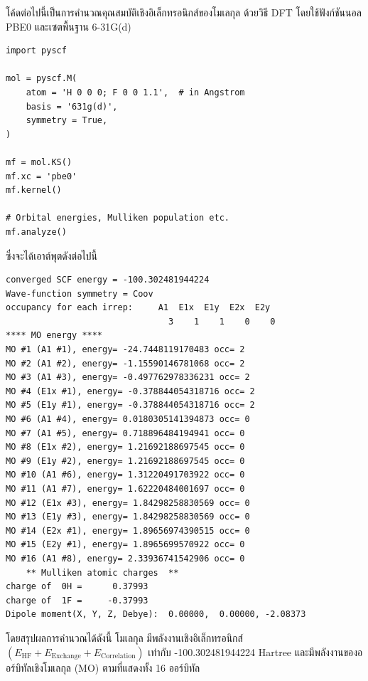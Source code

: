 โค้ดต่อไปนี้เป็นการคำนวณคุณสมบัติเชิงอิเล็กทรอนิกส์ของโมเลกุล  ด้วยวิธี DFT โดยใช้ฟังก์ชันนอล PBE0 และเซตพื้นฐาน 6-31G(d) 

\begin{lstlisting}[style=MyPython]
import pyscf

mol = pyscf.M(
    atom = 'H 0 0 0; F 0 0 1.1',  # in Angstrom
    basis = '631g(d)',
    symmetry = True,
)

mf = mol.KS()
mf.xc = 'pbe0'
mf.kernel()

# Orbital energies, Mulliken population etc.
mf.analyze()
\end{lstlisting}

\vspace{1em}
\noindent ซึ่งจะได้เอาต์พุตดังต่อไปนี้

\begin{lstlisting}[style=plain]
converged SCF energy = -100.302481944224
Wave-function symmetry = Coov
occupancy for each irrep:     A1  E1x  E1y  E2x  E2y
                                3    1    1    0    0
**** MO energy ****
MO #1 (A1 #1), energy= -24.7448119170483 occ= 2
MO #2 (A1 #2), energy= -1.15590146781068 occ= 2
MO #3 (A1 #3), energy= -0.497762978336231 occ= 2
MO #4 (E1x #1), energy= -0.378844054318716 occ= 2
MO #5 (E1y #1), energy= -0.378844054318716 occ= 2
MO #6 (A1 #4), energy= 0.0180305141394873 occ= 0
MO #7 (A1 #5), energy= 0.718896484194941 occ= 0
MO #8 (E1x #2), energy= 1.21692188697545 occ= 0
MO #9 (E1y #2), energy= 1.21692188697545 occ= 0
MO #10 (A1 #6), energy= 1.31220491703922 occ= 0
MO #11 (A1 #7), energy= 1.62220484001697 occ= 0
MO #12 (E1x #3), energy= 1.84298258830569 occ= 0
MO #13 (E1y #3), energy= 1.84298258830569 occ= 0
MO #14 (E2x #1), energy= 1.89656974390515 occ= 0
MO #15 (E2y #1), energy= 1.8965699570922 occ= 0
MO #16 (A1 #8), energy= 2.33936741542906 occ= 0
    ** Mulliken atomic charges  **
charge of  0H =      0.37993
charge of  1F =     -0.37993
Dipole moment(X, Y, Z, Debye):  0.00000,  0.00000, -2.08373
\end{lstlisting}

\vspace{1em}
โดยสรุปผลการคำนวณได้ดังนี้ โมเลกุล  มีพลังงานเชิงอิเล็กทรอนิกส์ $(E_{\text{HF}} + E_{\text{Exchange}} + 
E_{\text{Correlation}})$ เท่ากับ -100.302481944224 Hartree และมีพลังงานของออร์บิทัลเชิงโมเลกุล (MO) ตามที่แสดงทั้ง 16 ออร์บิทัล
